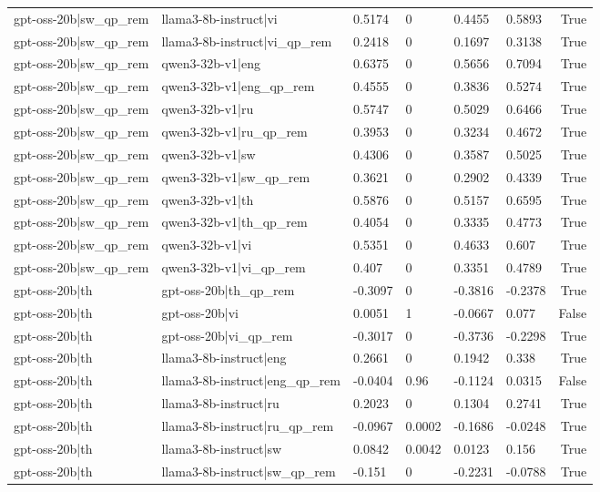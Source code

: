 \begin{table}
\begin{tabular}{llllllr}
gpt-oss-20b|sw_qp_rem & llama3-8b-instruct|vi & 0.5174 & 0 & 0.4455 & 0.5893 & True \\
gpt-oss-20b|sw_qp_rem & llama3-8b-instruct|vi_qp_rem & 0.2418 & 0 & 0.1697 & 0.3138 & True \\
gpt-oss-20b|sw_qp_rem & qwen3-32b-v1|eng & 0.6375 & 0 & 0.5656 & 0.7094 & True \\
gpt-oss-20b|sw_qp_rem & qwen3-32b-v1|eng_qp_rem & 0.4555 & 0 & 0.3836 & 0.5274 & True \\
gpt-oss-20b|sw_qp_rem & qwen3-32b-v1|ru & 0.5747 & 0 & 0.5029 & 0.6466 & True \\
gpt-oss-20b|sw_qp_rem & qwen3-32b-v1|ru_qp_rem & 0.3953 & 0 & 0.3234 & 0.4672 & True \\
gpt-oss-20b|sw_qp_rem & qwen3-32b-v1|sw & 0.4306 & 0 & 0.3587 & 0.5025 & True \\
gpt-oss-20b|sw_qp_rem & qwen3-32b-v1|sw_qp_rem & 0.3621 & 0 & 0.2902 & 0.4339 & True \\
gpt-oss-20b|sw_qp_rem & qwen3-32b-v1|th & 0.5876 & 0 & 0.5157 & 0.6595 & True \\
gpt-oss-20b|sw_qp_rem & qwen3-32b-v1|th_qp_rem & 0.4054 & 0 & 0.3335 & 0.4773 & True \\
gpt-oss-20b|sw_qp_rem & qwen3-32b-v1|vi & 0.5351 & 0 & 0.4633 & 0.607 & True \\
gpt-oss-20b|sw_qp_rem & qwen3-32b-v1|vi_qp_rem & 0.407 & 0 & 0.3351 & 0.4789 & True \\
gpt-oss-20b|th & gpt-oss-20b|th_qp_rem & -0.3097 & 0 & -0.3816 & -0.2378 & True \\
gpt-oss-20b|th & gpt-oss-20b|vi & 0.0051 & 1 & -0.0667 & 0.077 & False \\
gpt-oss-20b|th & gpt-oss-20b|vi_qp_rem & -0.3017 & 0 & -0.3736 & -0.2298 & True \\
gpt-oss-20b|th & llama3-8b-instruct|eng & 0.2661 & 0 & 0.1942 & 0.338 & True \\
gpt-oss-20b|th & llama3-8b-instruct|eng_qp_rem & -0.0404 & 0.96 & -0.1124 & 0.0315 & False \\
gpt-oss-20b|th & llama3-8b-instruct|ru & 0.2023 & 0 & 0.1304 & 0.2741 & True \\
gpt-oss-20b|th & llama3-8b-instruct|ru_qp_rem & -0.0967 & 0.0002 & -0.1686 & -0.0248 & True \\
gpt-oss-20b|th & llama3-8b-instruct|sw & 0.0842 & 0.0042 & 0.0123 & 0.156 & True \\
gpt-oss-20b|th & llama3-8b-instruct|sw_qp_rem & -0.151 & 0 & -0.2231 & -0.0788 & True \\

\end{tabular}
\end{table}
